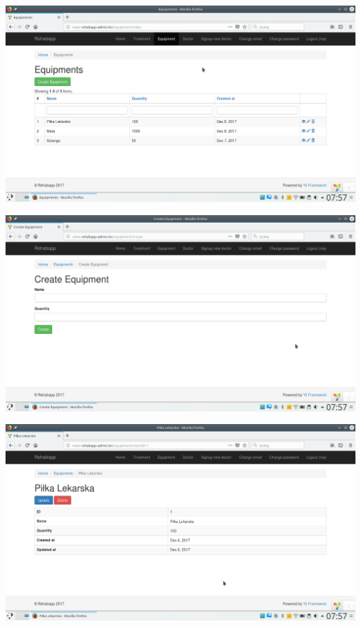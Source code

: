 \begin{itemize}
\vspace{0,5cm}
\includegraphics[scale=0.4]{obraz/5.png}
\vspace{0,5cm}

\vspace{0,5cm}
\includegraphics[scale=0.4]{obraz/6.png}
\vspace{0,5cm}

\vspace{0,5cm}
\includegraphics[scale=0.4]{obraz/7.png}
\vspace{0,5cm}


\end{itemize}
